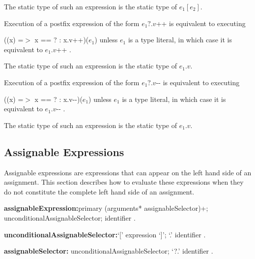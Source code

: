 \documentclass{article}
\newcommand{\code}[1]{{\sf #1}}
\begin{document}
\LMHash{}
The static type of such an expression is the static type of $e_1[e_2]$.

\LMHash{}
Execution of a postfix expression of the form \code{$e_1?.v$++} is equivalent to executing 

\code{((x) =$>$ x == \NULL? \NULL : x.v++)($e_1$)}
unless $e_1$ is a type literal, in which case it is equivalent to \code{$e_1.v$++}
.

\LMHash{}
The static type of such an expression is the static type of $e_1.v$.

\LMHash{}
Execution of a postfix expression of the form \code{$e_1?.v$-{}-} is equivalent to executing 

\code{((x) =$>$ x == \NULL? \NULL : x.v-{}-)($e_1$)}
unless $e_1$ is a type literal, in which case it is equivalent to \code{$e_1.v$-{}-}
.

\LMHash{}
The static type of such an expression is the static type of $e_1.v$.


\subsection{ Assignable Expressions}

\LMHash{}
Assignable expressions are expressions that can appear on the left hand side of an assignment.
This section describes how to evaluate these expressions when they do not constitute the complete left hand side of an assignment.




\begin{grammar}

{\bf assignableExpression:}primary (arguments* assignableSelector)+;
      \SUPER{} unconditionalAssignableSelector;
      identifier
    .
    
{\bf unconditionalAssignableSelector:}`[' expression `]'; %
         `{\escapegrammar .}' identifier
    .

{\bf assignableSelector:}
         unconditionalAssignableSelector;
         `{\escapegrammar ?.}' identifier
    .

\end{grammar}
\end{document}
